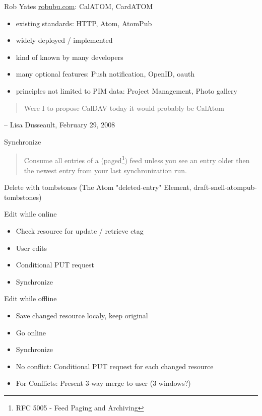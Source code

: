 \documentclass{beamer}
\begin{document}
\begin{frame}{Rob Yates \url{robubu.com}: CalATOM, CardATOM}
\begin{itemize}
  \item existing standards: HTTP, Atom, AtomPub
  \item widely deployed / implemented
  \item kind of known by many developers
  \item many optional features: Push notification, OpenID, oauth
  \item principles not limited to PIM data: Project Management, Photo gallery
\end{itemize}
\end{frame}

\begin{frame}
\begin{quote}
Were I to propose CalDAV today it would probably be CalAtom  
\end{quote}
-- Lisa Dusseault, February 29, 2008
\end{frame}

\begin{frame}{Synchronize}
  \begin{quote}
    Consume all entries of a (paged\footnote{RFC 5005 - Feed Paging and
      Archiving}) feed unless you see an entry older then the newest entry from
    your last synchronization run.
  \end{quote}
  Delete with tombstones (The Atom "deleted-entry" Element, draft-snell-atompub-tombstones)
\end{frame}

\begin{frame}{Edit while online}
  \begin{itemize}
  \item Check resource for update / retrieve etag
  \item User edits
  \item Conditional PUT request
  \item Synchronize
  \end{itemize}
\end{frame}

\begin{frame}{Edit while offline}
  \begin{itemize}
  \item Save changed resource localy, keep original
  \item Go online
  \item Synchronize
  \item No conflict: Conditional PUT request for each changed resource
  \item For Conflicts: Present 3-way merge to user (3 windows?)
  \end{itemize}
\end{frame}
\end{document}
